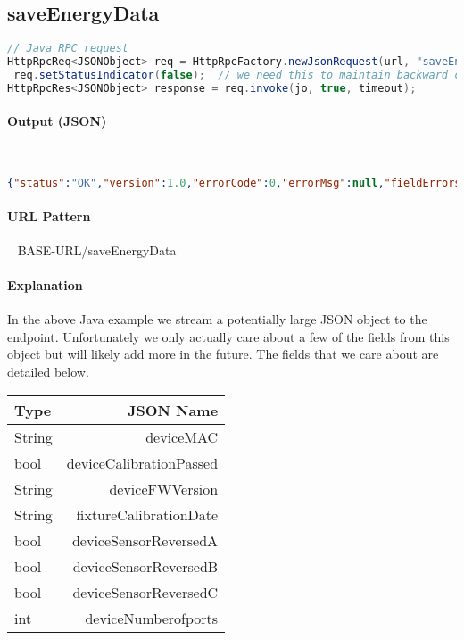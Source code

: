 \documentclass[
10pt, %
letterpaper, %
oneside, %
headinclude,footinclude, %
BCOR5mm, %
]{scrartcl}
\begin{document}

\subsection{saveEnergyData}
\begin{lstlisting}[language=Java]
// Java RPC request
HttpRpcReq<JSONObject> req = HttpRpcFactory.newJsonRequest(url, "saveEnergyData");
 req.setStatusIndicator(false);  // we need this to maintain backward compatibility
HttpRpcRes<JSONObject> response = req.invoke(jo, true, timeout);
\end{lstlisting}

\paragraph{Output (JSON)}~
\begin{lstlisting}[language=json]
{"status":"OK","version":1.0,"errorCode":0,"errorMsg":null,"fieldErrors":null,"data":null}
\end{lstlisting}

\paragraph{URL Pattern} 
~\newline
BASE-URL/saveEnergyData

\paragraph{Explanation}
In the above Java example we stream a potentially large JSON object to the endpoint. Unfortunately we only actually care about a few of the fields from this object but will likely add more in the future. The fields that we care about are detailed below.
~\newline\newline\textsf{}
\begin{tabular}{| l | r |}
\hline
\textbf{Type} & \textbf{JSON Name} \\
\hline
String & deviceMAC \\
bool & deviceCalibrationPassed \\
String & deviceFWVersion \\
String & fixtureCalibrationDate \\
bool & deviceSensorReversedA \\
bool & deviceSensorReversedB \\
bool & deviceSensorReversedC \\
int & deviceNumberofports \\
\hline
\end{tabular}
\end{document}
